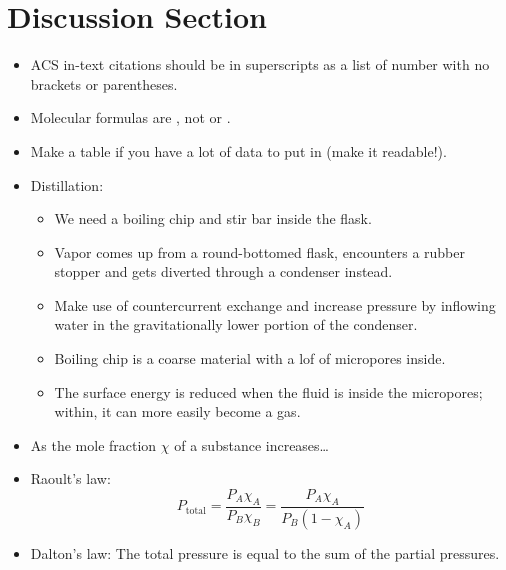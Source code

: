 \documentclass[../notes.tex]{subfiles}
\begin{document}
\section{Discussion Section}
\begin{itemize}
    \item ACS in-text citations should be in superscripts as a list of number with no brackets or parentheses.
    \item Molecular formulas are , not  or .
    \item Make a table if you have a lot of data to put in (make it readable!).
    \item Distillation:
    \begin{itemize}
        \item We need a boiling chip and stir bar inside the flask.
        \item Vapor comes up from a round-bottomed flask, encounters a rubber stopper and gets diverted through a condenser instead.
        \item Make use of countercurrent exchange and increase pressure by inflowing water in the gravitationally lower portion of the condenser.
        \item Boiling chip is a coarse material with a lof of micropores inside.
        \item The surface energy is reduced when the fluid is inside the micropores; within, it can more easily become a gas.
    \end{itemize}
    \item As the mole fraction $\chi$ of a substance  increases\dots
    \item Raoult's law:
    \begin{equation*}
        P_\text{total} = \frac{P_A\chi_A}{P_B\chi_B} = \frac{P_A\chi_A}{P_B(1-\chi_A)}
    \end{equation*}
    \item Dalton's law: The total pressure is equal to the sum of the partial pressures.
\end{itemize}
\end{document}
